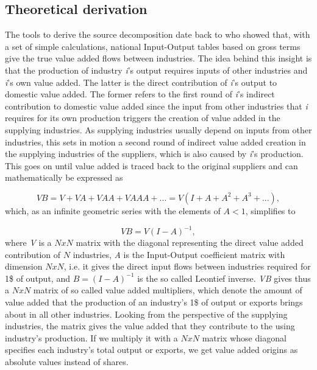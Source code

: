 \documentclass[a4paper]{article}\usepackage[]{graphicx}\usepackage[]{color}
\begin{document}
\subsection{Theoretical derivation}

The tools to derive the source decomposition date back to \citet{wale36}
who showed that, with a set of simple calculations, national Input-Output
tables based on gross terms give the true value added flows between
industries. The idea behind this insight is that the production of
industry \textit{i}'s output requires inputs of other industries and
\textit{i}'s own value added. The latter is the direct contribution
of \textit{i}'s output to domestic value added. The former refers
to the first round of \textit{i}'s indirect contribution to domestic
value added since the input from other industries that \textit{i}
requires for its own production triggers the creation of value added
in the supplying industries. As supplying industries usually depend
on inputs from other industries, this sets in motion a second round
of indirect value added creation in the supplying industries of the
suppliers, which is also caused by \textit{i}'s production. This goes
on until value added is traced back to the original suppliers and
can mathematically be expressed as

\begin{equation}
VB=V+VA+VAA+VAAA+...=V(I+A+A^{2}+A^{3}+...),
\end{equation}
which, as an infinite geometric series with the elements of $A<1$,
simplifies to

\begin{equation}
VB=V(I-A)^{-1},
\end{equation}
where \textit{V} is a $NxN$ matrix with the diagonal representing
the direct value added contribution of $N$ industries, \textit{A}
is the Input-Output coefficient matrix with dimension $NxN$, i.e.
it gives the direct input flows between industries required for 1\$
of output, and $B=(I-A)^{-1}$ is the so called Leontief inverse.
\textit{VB} gives thus a $NxN$ matrix of so called value added multipliers,
which denote the amount of value added that the production of an industry's
1\$ of output or exports brings about in all other industries. Looking
from the perspective of the supplying industries, the matrix gives
the value added that they contribute to the using industry's production.
If we multiply it with a $NxN$ matrix whose diagonal specifies each
industry's total output or exports, we get value added origins as
absolute values instead of shares.
\end{document}
